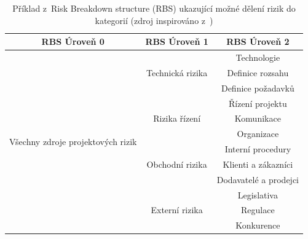 \begin{itemize}
\begin{table}[]
\begin{tabular}{|c|c|c|}
\hline
RBS Úroveň 0                                        & RBS Úroveň 1                      & RBS Úroveň 2          \\ \hline
\multirow{12}{*}{Všechny zdroje projektových rizik} & \multirow{3}{*}{Technická rizika} & Technologie           \\ \cline{3-3} 
                                                    &                                   & Definice rozsahu      \\ \cline{3-3} 
                                                    &                                   & Definice požadavků    \\ \cline{2-3} 
                                                    & \multirow{3}{*}{Rizika řízení}    & Řízení projektu       \\ \cline{3-3} 
                                                    &                                   & Komunikace            \\ \cline{3-3} 
                                                    &                                   & Organizace            \\ \cline{2-3} 
                                                    & \multirow{3}{*}{Obchodní rizika}  & Interní procedury     \\ \cline{3-3} 
                                                    &                                   & Klienti a zákazníci   \\ \cline{3-3} 
                                                    &                                   & Dodavatelé a prodejci \\ \cline{2-3} 
                                                    & \multirow{3}{*}{Externí rizika}   & Legislativa           \\ \cline{3-3} 
                                                    &                                   & Regulace              \\ \cline{3-3} 
                                                    &                                   & Konkurence            \\ \hline
\end{tabular}
\caption{Příklad z~Risk Breakdown structure (RBS) ukazující možné dělení rizik do kategorií (zdroj inspirováno z~\cite{PMBOK})}
\label{RBS}
\end{table}


\end{itemize}
